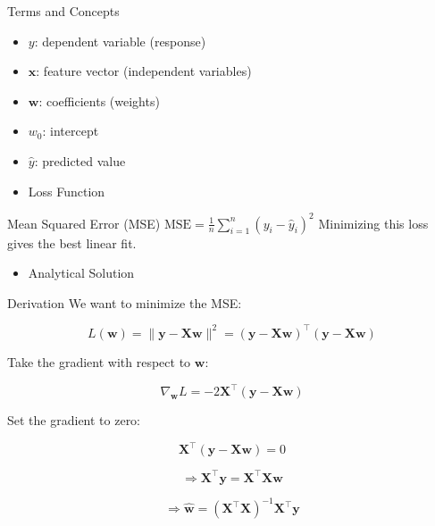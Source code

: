 \documentclass[aspectratio=169]{beamer}
\begin{document}
\begin{frame}[label={sec:orga9727d4}]{Terms and Concepts}
\begin{itemize}
\item \(y\): dependent variable (response)
\item \(\mathbf{x}\): feature vector (independent variables)
\item \(\mathbf{w}\): coefficients (weights)
\item \(w_0\): intercept
\item \(\hat{y}\): predicted value
\item Loss Function
\end{itemize}
\begin{block}{Mean Squared Error (MSE)}
\(\text{MSE} = \frac{1}{n} \sum_{i=1}^{n} (y_i - \hat{y}_i)^2\)
  Minimizing this loss gives the best linear fit.


\begin{itemize}
\item Analytical Solution
\end{itemize}
\end{block}
\end{frame}
\begin{frame}[label={sec:orgff5d143}]{Derivation}
We want to minimize the MSE:

\begin{equation}
L(\mathbf{w}) = \| \mathbf{y} - \mathbf{X} \mathbf{w} \|^2 = (\mathbf{y} - \mathbf{X} \mathbf{w})^\top (\mathbf{y} - \mathbf{X} \mathbf{w})
\end{equation}

Take the gradient with respect to \(\mathbf{w}\):

\begin{equation}
\nabla_{\mathbf{w}} L = -2 \mathbf{X}^\top (\mathbf{y} - \mathbf{X} \mathbf{w})
\end{equation}

Set the gradient to zero:

\begin{equation}
\mathbf{X}^\top (\mathbf{y} - \mathbf{X} \mathbf{w}) = 0
\end{equation}

\begin{equation}
\Rightarrow \mathbf{X}^\top \mathbf{y} = \mathbf{X}^\top \mathbf{X} \mathbf{w}
\end{equation}

\begin{equation}
\Rightarrow \hat{\mathbf{w}} = (\mathbf{X}^\top \mathbf{X})^{-1} \mathbf{X}^\top \mathbf{y}
\end{equation}

\end{frame}
\end{document}
